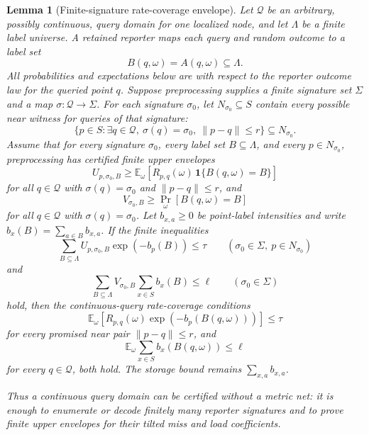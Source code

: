 \documentclass[10pt]{article}
\newtheorem{lemma}[theorem]{Lemma}
\theoremstyle{definition}
\newcommand{\E}{\mathbb{E}}
\begin{document}
\begin{lemma}[Finite-signature rate-coverage envelope]
   \label{lem:finite-signature-rate-coverage}
   Let \(\mathcal Q\) be an arbitrary, possibly continuous, query domain for
   one localized node, and let \(\Lambda\) be a finite label universe.  A
   retained reporter maps each query and random outcome to a label set
   \[
      B(q,\omega)=A(q,\omega)\subseteq\Lambda .
   \]
   All probabilities and expectations below are with respect to the reporter
   outcome law for the queried point \(q\).
   Suppose preprocessing supplies a finite signature set \(\Sigma\) and a map
   \(\sigma:\mathcal Q\to\Sigma\).  For each signature \(\sigma_0\), let
   \(N_{\sigma_0}\subseteq S\) contain every possible near witness for queries
   of that signature:
   \[
      \{p\in S:\exists q\in\mathcal Q,\ \sigma(q)=\sigma_0,\ \|p-q\|\le r\}
      \subseteq N_{\sigma_0}.
      \tag{FS1}
   \]
   Assume that for every signature \(\sigma_0\), every label set
   \(B\subseteq\Lambda\), and every \(p\in N_{\sigma_0}\), preprocessing has
   certified finite upper envelopes
   \[
      U_{p,\sigma_0,B}
      \ge
      \E_{\omega}\!\left[
         R_{p,q}(\omega)\,
         \mathbf 1\{B(q,\omega)=B\}
      \right]
      \tag{FS2}
   \]
   for all \(q\in\mathcal Q\) with \(\sigma(q)=\sigma_0\) and
   \(\|p-q\|\le r\), and
   \[
      V_{\sigma_0,B}
      \ge
      \Pr_{\omega}[B(q,\omega)=B]
      \tag{FS3}
   \]
   for all \(q\in\mathcal Q\) with \(\sigma(q)=\sigma_0\).  Let
   \(b_{x,a}\ge0\) be point-label intensities and write
   \(b_x(B)=\sum_{a\in B}b_{x,a}\).  If the finite inequalities
   \[
      \sum_{B\subseteq\Lambda}
      U_{p,\sigma_0,B}\exp(-b_p(B))
      \le \tau
      \qquad(\sigma_0\in\Sigma,\ p\in N_{\sigma_0})
      \tag{FS4}
   \]
   and
   \[
      \sum_{B\subseteq\Lambda}
      V_{\sigma_0,B}
      \sum_{x\in S}b_x(B)
      \le \ell
      \qquad(\sigma_0\in\Sigma)
      \tag{FS5}
   \]
   hold, then the continuous-query rate-coverage conditions
   \[
      \E_{\omega}\!\left[
         R_{p,q}(\omega)\exp(-b_p(B(q,\omega)))
      \right]\le\tau
      \tag{FS6}
   \]
   for every promised near pair \(\|p-q\|\le r\), and
   \[
      \E_{\omega}\sum_{x\in S}b_x(B(q,\omega))\le\ell
      \tag{FS7}
   \]
   for every \(q\in\mathcal Q\), both hold.  The storage bound remains
   \(\sum_{x,a}b_{x,a}\).

   Thus a continuous query domain can be certified without a metric net: it is
   enough to enumerate or decode finitely many reporter signatures and to prove
   finite upper envelopes for their tilted miss and load coefficients.
\end{lemma}
\end{document}
